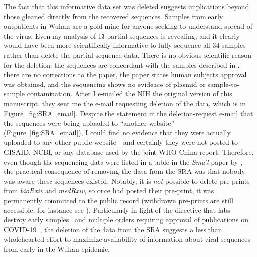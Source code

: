 \documentclass[9pt,twocolumn,twoside]{gsajnl_modified}
\begin{document}
The fact that this informative data set was deleted suggests implications beyond those gleaned directly from the recovered sequences.
Samples from early outpatients in Wuhan are a gold mine for anyone seeking to understand spread of the virus.
Even my analysis of 13 partial sequences is revealing, and it clearly would have been more scientifically informative to fully sequence all 34 samples rather than delete the partial sequence data.
There is no obvious scientific reason for the deletion: the sequences are concordant with the samples described in \citet{wang2020medRxiv,wang2020small}, there are no corrections to the paper, the paper states human subjects approval was obtained, and the sequencing shows no evidence of plasmid or sample-to-sample contamination.
After I e-mailed the NIH the original version of this manuscript, they sent me the e-mail requesting deletion of the data, which is in Figure~\ref{fig:SRA_email}.
Despite the statement in the deletion-request e-mail that the sequences were being uploaded to ``another website'' (Figure~\ref{fig:SRA_email}), I could find no evidence that they were actually uploaded to any other public website---and certainly they were not posted to GISAID, NCBI, or any database used by the joint WHO-China report.
Therefore, even though the sequencing data were listed in a table in the \textit{Small} paper by \citet{wang2020small}, the practical consequence of removing the data from the SRA was that nobody was aware these sequences existed.
Notably, it is \emph{not} possible to delete pre-prints from \textit{bioRxiv} and \textit{medRxiv}, so once \citet{wang2020medRxiv} had posted their pre-print, it was permanently committed to the public record (withdrawn pre-prints are still accessible, for instance see \citet{yang2020epidemiological}).
Particularly in light of the directive that labs destroy early samples~\citep{pinghui2020SCMP} and multiple orders requiring approval of publications on COVID-19~\citep{chinacdc2020, Kang2020}, the deletion of the data from the SRA suggests a less than wholehearted effort to maximize availability of information about viral sequences from early in the Wuhan epidemic.
\end{document}
